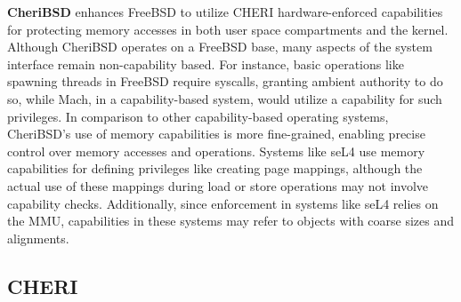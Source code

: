 \textbf{CheriBSD} enhances FreeBSD to utilize CHERI hardware-enforced capabilities for protecting memory accesses in both user space compartments 
and the kernel. Although CheriBSD operates on a FreeBSD base, many aspects of the system interface remain non-capability based. For instance, 
basic operations like spawning threads in FreeBSD require syscalls, granting ambient authority to do so, while Mach, in a capability-based system, 
would utilize a capability for such privileges. In comparison to other capability-based operating systems, CheriBSD's use of memory capabilities 
is more fine-grained, enabling precise control over memory accesses and operations. Systems like seL4 use memory capabilities for defining privileges 
like creating page mappings, although the actual use of these mappings during load or store operations may not involve capability checks. Additionally, 
since enforcement in systems like seL4 relies on the MMU, capabilities in these systems may refer to objects with coarse sizes and alignments.

\subsection{CHERI}


